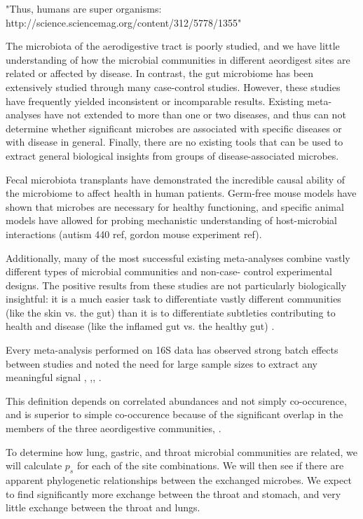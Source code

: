 \documentclass[12pt]{article}
\begin{document}
"Thus, humans are super organisms: http://science.sciencemag.org/content/312/5778/1355"

The microbiota of 
the aerodigestive tract is poorly studied, and we have little understanding 
of how the microbial communities in different aeordigest sites are related or 
affected by disease. In contrast, the gut microbiome has 
been extensively studied through many case-control studies. 
However, these studies have frequently yielded inconsistent or incomparable 
results. Existing meta-analyses have not extended to more than one or two 
diseases, and thus can not determine whether significant microbes are 
associated with specific diseases or with disease in general. 
Finally, there are no existing tools that can be used to extract general 
biological insights from groups of disease-associated microbes.

Fecal microbiota transplants have demonstrated the incredible
causal ability of the microbiome to affect health in 
human patients. Germ-free mouse models have shown that microbes are
necessary for healthy functioning, and specific animal models have  
allowed for probing mechanistic understanding of host-microbial 
interactions (autism 440 ref, gordon mouse experiment ref). 

Additionally, many of the most successful existing meta-analyses 
combine vastly different types of microbial communities and non-case-
control experimental designs. The positive results from these studies 
are not particularly biologically insightful: it is a much easier task 
to differentiate vastly different communities (like the skin vs. the 
gut) than it is to differentiate subtleties contributing to health and 
disease (like the inflamed gut vs. the healthy gut) \cite{knights-supervised-2010}.

Every meta-analysis performed on 16S data has observed 
strong batch effects between studies and noted the need for large 
sample sizes to extract any meaningful signal \cite{sze-signal-2016},
\cite{walters-ob_meta-2014},\cite{knights-supervised-2010},
\cite{lozupone-meta-2013}. 

This definition depends on correlated abundances and not simply co-occurence, and is 
superior to simple co-occurence because of the significant overlap in the
members of the three aeordigestive communities\cite{bassis-source-2015}, \cite{charslon-topographical-2011}.

To determine how lung, gastric, and throat microbial communities are related,
we will calculate $p_s$ for each of the site combinations. We will 
then see if there are apparent phylogenetic relationships between
the exchanged microbes. We expect to find significantly more exchange
between the throat and stomach, and very little exchange between the throat and lungs. 
\end{document}
